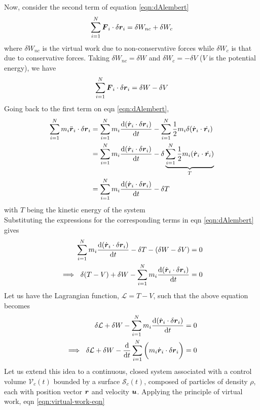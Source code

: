 \documentclass[12pt]{report}
\begin{document}
Now, consider the second term of equation \ref{eqn:dAlembert}
\begin{align*}
  \sum_{i=1}^N \vb*{F}_i \cdot \delta \vb*{r}_i = \delta W_{nc} + \delta W_c 
\end{align*}
where $\delta W_{nc}$ is the virtual work due to non-conservative forces while $\delta W_c$ is that due to conservative forces. Taking $\delta W_{nc} =  \delta W$ and $\delta W_c = -\delta V$ ($V$ is the potential energy), we have 
\begin{align*}
\sum_{i=1}^N \vb*{F}_i \cdot \delta \vb*{r}_i = \delta W - \delta V 
\end{align*}
Going back to the first term on eqn \ref{eqn:dAlembert}, 
\begin{align}
\sum_{i=1}^N m_i\ddot{\vb*{r}}_i \cdot \delta \vb*{r}_i &= \sum_{i=1}^N m_i\dv{(\dot{\vb*{r}}_i \cdot \delta \vb*{r}_i)}{t}  - \sum_{i=1}^N \frac{1}{2} m_i\delta (\dot{\vb*{r}}_i \cdot \dot{\vb*{r}_i}) \\
  &= \sum_{i=1}^N m_i\dv{(\dot{\vb*{r}}_i \cdot \delta \vb*{r}_i)}{t}  - \delta \underbrace{\sum_{i=1}^N \frac{1}{2} m_i (\dot{\vb*{r}}_i \cdot \dot{\vb*{r}_i})}_{T} \\
  &= \sum_{i=1}^N m_i \dv{(\dot{\vb*{r}}_i \cdot \delta \vb*{r}_i)}{t} - \delta T
\end{align}
with $T$ being the kinetic energy of the system \\
Substituting the expressions for the corresponding terms in eqn \ref{eqn:dAlembert} gives
\begin{align*}
\sum_{i=1}^N m_i\dv{(\dot{\vb*{r}}_i \cdot \delta \vb*{r}_i)}{t} - \delta T - (\delta W - \delta V ) = 0 \\
\implies~ \delta (T - V) + \delta W - \sum_{i=1}^N m_i \dv{(\dot{\vb*{r}}_i \cdot \delta \vb*{r}_i)}{t} = 0
\end{align*}
Let us have the Lagrangian function, $\mathcal{L} = T - V$, such that the above equation becomes
\begin{align}
\delta \mathcal{L} + \delta W - \sum_{i=1}^N m_i \dv{(\dot{\vb*{r}}_i \cdot \delta \vb*{r}_i)}{t} = 0 \notag \\
\implies~ \delta \mathcal{L} + \delta W - \dv{}{t}\sum_{i=1}^N \bigg(m_i\dot{\vb*{r}}_i \cdot \delta \vb*{r}_i\bigg) = 0 \label{eqn:virtual-work-eqn}
\end{align}
Let us extend this idea to a continuous, closed system associated with a control volume $\mathcal{V}_c (t)$ bounded by a surface $\mathcal{S}_c (t)$, composed of particles of density $\rho$, each with position vector $\vb*{r}$ and velocity $\vb*{u}$. Applying the principle of virtual work, eqn \ref{eqn:virtual-work-eqn}
\end{document}
